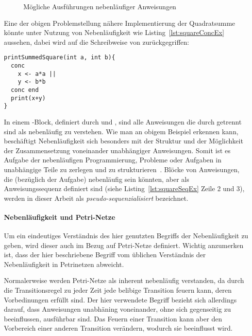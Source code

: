 \begin{figure}[hbt]
\begin{subfigure}{\textwidth}
\begin{tikzpicture}
\end{tikzpicture}
\end{subfigure}

\caption{Mögliche Ausführungen nebenläufiger Anweisungen}\label{fig:concAnweisungen}
\end{figure}

Eine der obigen Problemstellung nähere Implementierung der Quadratsumme könnte unter Nutzung von Nebenläufigkeit wie Listing~\ref{lst:squareConcEx} aussehen, dabei wird auf die Schreibweise von \textcite{Herrtwich1989} zurückgegriffen:
\begin{lstlisting}[caption={Beispiel eines Programms mit nebenläufigem Code in einem \code{conc}-Block. Das Programm gibt die Summe von zwei Quadratzahlen aus, wobei die Berechnung der Quadratzahlen nebenläufig stattfindet.}, label={lst:squareConcEx}]
printSummedSquare(int a, int b){
  conc 
    x <- a*a ||
    y <- b*b
  conc end
  print(x+y)
}
\end{lstlisting}
In einem -Block, definiert durch  und , sind alle Anweisungen die durch \code{||} getrennt sind als nebenläufig zu verstehen. Wie man an obigem Beispiel erkennen kann, beschäftigt Nebenläufigkeit sich besonders mit der Struktur und der Möglichkeit der Zusammensetzung voneinander unabhängiger Anweisungen. Somit ist es Aufgabe der nebenläufigen Programmierung, Probleme oder Aufgaben in unabhängige Teile zu zerlegen und zu strukturieren~\cite{Pike2012,Hettel2016}. Blöcke von Anweisungen, die (bezüglich der Aufgabe) nebenläufig sein könnten, aber als Anweisungssequenz definiert sind (siehe Listing~\ref{lst:squareSeqEx} Zeile 2 und 3), werden in dieser Arbeit als \emph{pseudo-sequenzialisiert} bezeichnet.

\paragraph{Nebenläufigkeit und Petri-Netze}
Um ein eindeutiges Verständnis des hier genutzten Begriffs der Nebenläufigkeit zu geben, wird dieser auch im Bezug auf Petri-Netze definiert. Wichtig anzumerken ist, dass der hier beschriebene Begriff vom üblichen Verständnis der Nebenläufigkeit in Petrinetzen abweicht. 

Normalerweise werden Petri-Netze  als inherent nebenläufig verstanden, da durch die Transitionsregel zu jeder Zeit jede belibige Transition feuern kann, deren Vorbedinungen erfüllt sind. Der hier verwendete Begriff bezieht sich allerdings darauf, dass Anweisungen unabhäning voneinander, ohne sich gegenseitig zu beeinflussen, ausführbar sind. Das Feuern einer Transition kann aber den Vorbereich einer anderen Transition verändern, wodurch sie beeinflusst wird.

